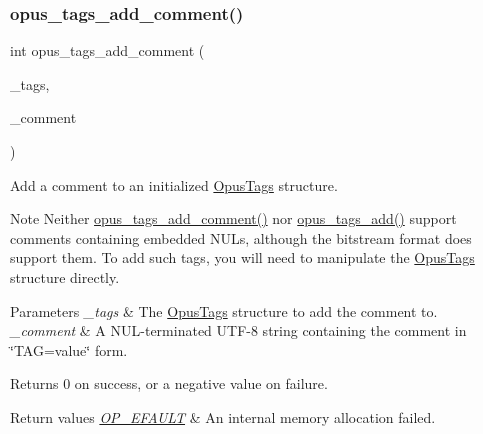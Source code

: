 \subsubsection{\texorpdfstring{opus\_tags\_add\_comment()}{opus\_tags\_add\_comment()}}
{\footnotesize\ttfamily int opus\+\_\+tags\+\_\+add\+\_\+comment (\begin{DoxyParamCaption}\item[{\mbox{\hyperlink{struct_opus_tags}{Opus\+Tags}} $\ast$}]{\+\_\+tags,  }\item[{const char $\ast$}]{\+\_\+comment }\end{DoxyParamCaption})}

Add a comment to an initialized \mbox{\hyperlink{struct_opus_tags}{Opus\+Tags}} structure. \begin{DoxyNote}{Note}
Neither \mbox{\hyperlink{group__header__info_ga76ac5425d8c2ca9a994f84adfcc6cb98}{opus\+\_\+tags\+\_\+add\+\_\+comment()}} nor \mbox{\hyperlink{group__header__info_ga42bc0321740b618271c4cd0ae076d29a}{opus\+\_\+tags\+\_\+add()}} support comments containing embedded N\+U\+Ls, although the bitstream format does support them. To add such tags, you will need to manipulate the \mbox{\hyperlink{struct_opus_tags}{Opus\+Tags}} structure directly. 
\end{DoxyNote}

\begin{DoxyParams}{Parameters}
{\em \+\_\+tags} & The \mbox{\hyperlink{struct_opus_tags}{Opus\+Tags}} structure to add the comment to. \\
\hline
{\em \+\_\+comment} & A N\+U\+L-\/terminated U\+T\+F-\/8 string containing the comment in \char`\"{}\+T\+A\+G=value\char`\"{} form. \\
\hline
\end{DoxyParams}
\begin{DoxyReturn}{Returns}
0 on success, or a negative value on failure. 
\end{DoxyReturn}

\begin{DoxyRetVals}{Return values}
{\em \mbox{\hyperlink{group__error__codes_ga2ddb887c0bb55c74ea6be391fabcba59}{O\+P\+\_\+\+E\+F\+A\+U\+LT}}} & An internal memory allocation failed. \\
\hline
\end{DoxyRetVals}
\mbox{\label{group__header__info_ga16d4f85561a965d56e0c5177fa129c35}} 
